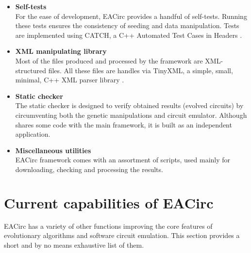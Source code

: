 \documentclass[12pt,oneside]{fithesis2}
\newcommand{\squarebullet}{\textcolor{black}{\raisebox{0.15em}{\rule{4pt}{4pt}}}}
\newenvironment{myItemize}{
  \begin{itemize}[leftmargin=2em,rightmargin=1em,itemsep=\parskip ,parsep=0em,topsep=0em,partopsep=0em]
  \renewcommand{\labelitemi}{\squarebullet}
  \renewcommand{\labelitemii}{$\diamond$}
}{
  \end{itemize}
}
\begin{document}
\begin{myItemize}
\item \textbf{Self-tests}\\
For the ease of development, EACirc provides a handful of self-tests. Running these tests ensures the consistency
of seeding and data manipulation. Tests are implemented using CATCH, a C++ Automated Test Cases in Headers \parencite{catch}.
\item \textbf{XML manipulating library}\\
Most of the files produced and processed by the framework are XML-structured files. All these files are handles via
TinyXML, a simple, small, minimal, C++ XML parser library \parencite{tinyxml}.
\item \textbf{Static checker}\\
The static checker is designed to verify obtained results (evolved circuits) by circumventing both the genetic 
manipulations and circuit emulator. Although  shares some code with the main framework, it is built as an independent application.
\item \textbf{Miscellaneous utilities}\\
EACirc framework comes with an assortment of scripts, used mainly for downloading, checking and processing the results.
\end{myItemize}

\section{Current capabilities of EACirc}
\label{sec:eacirc-capabilities}

EACirc has a variety of other functions improving the core features of evolutionary algorithms and software circuit emulation.
This section provides a short and by no means exhaustive list of them.
\end{document}
